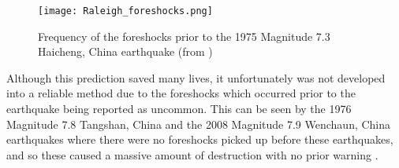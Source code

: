 \documentclass[12pt]{report}
\begin{document}
\begin{figure}[h!]
	\begin{center}
		\texttt{[image: Raleigh\_foreshocks.png]}
		\caption{Frequency of the foreshocks prior to the 1975 Magnitude 7.3 Haicheng, China earthquake (from \cite{Raleigh1977})}
		\label{Ray_fore}
	\end{center}
\end{figure}

Although this prediction saved many lives, it unfortunately was not developed into a reliable method due to the foreshocks which occurred prior to the earthquake being reported as uncommon. This can be seen by the 1976 Magnitude 7.8 Tangshan, China and the 2008 Magnitude 7.9 Wenchaun, China earthquakes where there were no foreshocks picked up before these earthquakes, and so these caused a massive amount of destruction with no prior warning \citep{Chen2010}. 

%
%
%
\end{document}
